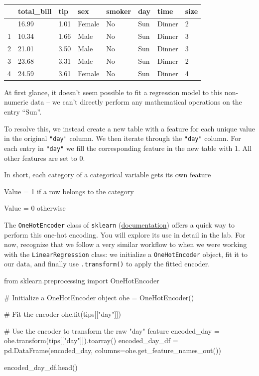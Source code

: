 \documentclass[
  letterpaper,
  DIV=11,
  numbers=noendperiod]{scrreprt}
\newenvironment{Shaded}{\begin{snugshade}}{\end{snugshade}}
\newcommand{\CommentTok}[1]{\textcolor[rgb]{0.37,0.37,0.37}{#1}}
\newcommand{\ImportTok}[1]{\textcolor[rgb]{0.00,0.46,0.62}{#1}}
\newcommand{\NormalTok}[1]{\textcolor[rgb]{0.00,0.23,0.31}{#1}}
\newcommand{\OperatorTok}[1]{\textcolor[rgb]{0.37,0.37,0.37}{#1}}
\newcommand{\StringTok}[1]{\textcolor[rgb]{0.13,0.47,0.30}{#1}}
\begin{document}
\begin{longtable}[]{@{}llllllll@{}}
\toprule\noalign{}
& total\_bill & tip & sex & smoker & day & time & size \\
\midrule\noalign{}
\endhead
\bottomrule\noalign{}
\endlastfoot
0 & 16.99 & 1.01 & Female & No & Sun & Dinner & 2 \\
1 & 10.34 & 1.66 & Male & No & Sun & Dinner & 3 \\
2 & 21.01 & 3.50 & Male & No & Sun & Dinner & 3 \\
3 & 23.68 & 3.31 & Male & No & Sun & Dinner & 2 \\
4 & 24.59 & 3.61 & Female & No & Sun & Dinner & 4 \\
\end{longtable}

At first glance, it doesn't seem possible to fit a regression model to
this non-numeric data -- we can't directly perform any mathematical
operations on the entry ``Sun''.

To resolve this, we instead create a new table with a feature for each
unique value in the original \texttt{"day"} column. We then iterate
through the \texttt{"day"} column. For each entry in \texttt{"day"} we
fill the corresponding feature in the new table with 1. All other
features are set to 0.

In short, each category of a categorical variable gets its own feature

Value = 1 if a row belongs to the category

Value = 0 otherwise

The \texttt{OneHotEncoder} class of \texttt{sklearn}
(\href{https://scikit-learn.org/stable/modules/generated/sklearn.preprocessing.OneHotEncoder.html\#sklearn.preprocessing.OneHotEncoder.get_feature_names_out}{documentation})
offers a quick way to perform this one-hot encoding. You will explore
its use in detail in the lab. For now, recognize that we follow a very
similar workflow to when we were working with the
\texttt{LinearRegression} class: we initialize a \texttt{OneHotEncoder}
object, fit it to our data, and finally use \texttt{.transform()} to
apply the fitted encoder.

\begin{Shaded}
\begin{Highlighting}[]
\ImportTok{from}\NormalTok{ sklearn.preprocessing }\ImportTok{import}\NormalTok{ OneHotEncoder}

\CommentTok{\# Initialize a OneHotEncoder object}
\NormalTok{ohe }\OperatorTok{=}\NormalTok{ OneHotEncoder()}

\CommentTok{\# Fit the encoder}
\NormalTok{ohe.fit(tips[[}\StringTok{"day"}\NormalTok{]])}

\CommentTok{\# Use the encoder to transform the raw "day" feature}
\NormalTok{encoded\_day }\OperatorTok{=}\NormalTok{ ohe.transform(tips[[}\StringTok{"day"}\NormalTok{]]).toarray()}
\NormalTok{encoded\_day\_df }\OperatorTok{=}\NormalTok{ pd.DataFrame(encoded\_day, columns}\OperatorTok{=}\NormalTok{ohe.get\_feature\_names\_out())}

\NormalTok{encoded\_day\_df.head()}
\end{Highlighting}
\end{Shaded}
\end{document}

